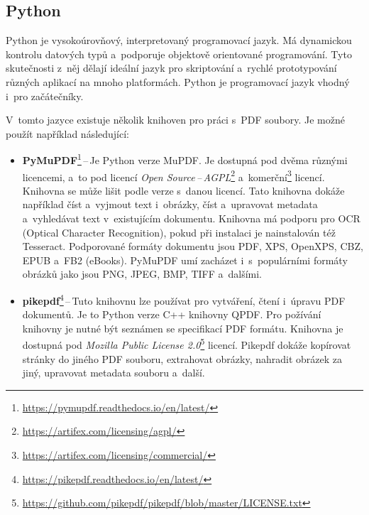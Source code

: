 \subsection*{Python} \label{python_libraries}

Python je vysokoúrovňový, interpretovaný programovací jazyk. Má dynamickou
kontrolu datových typů a~podporuje objektově orientované programování. Tyto
skutečnosti z~něj dělají ideální jazyk pro skriptování a~rychlé prototypování
různých aplikací na mnoho platformách. Python je programovací jazyk vhodný i~pro
začátečníky.
\cite{Python}

V~tomto jazyce existuje několik knihoven pro práci s~PDF soubory. Je možné použít
například následující: 
\begin{itemize}
    \item \textbf{PyMuPDF}\footnote{
    \href{https://pymupdf.readthedocs.io/en/latest/}{https://pymupdf.readthedocs.io/en/latest/}
    }\,--\,Je Python verze MuPDF. Je dostupná pod dvěma různými licencemi, a~to pod
    licencí \emph{Open Source\,--\,AGPL}\footnote{
    \href{https://artifex.com/licensing/agpl/}{https://artifex.com/licensing/agpl/}
    } a~komerční\footnote{
    \href{https://artifex.com/licensing/commercial/}{https://artifex.com/licensing/commercial/}
    } licencí. Knihovna se může lišit podle verze s~danou licencí. Tato knihovna
    dokáže například číst a~vyjmout text i~obrázky, číst a~upravovat
    metadata a~vyhledávat text v~existujícím dokumentu.
    Knihovna má podporu pro OCR (Optical Character Recognition), pokud při
    instalaci je nainstalován též Tesseract. Podporované formáty dokumentu jsou
    PDF, XPS, OpenXPS, CBZ, EPUB a~FB2 (eBooks). PyMuPDF umí zacházet
    i~s~populárními formáty obrázků jako jsou PNG, JPEG, BMP, TIFF a~dalšími.

    \item \textbf{pikepdf}\footnote{
    \href{https://pikepdf.readthedocs.io/en/latest/}{https://pikepdf.readthedocs.io/en/latest/}
    }\,--\,Tuto knihovnu lze používat pro vytváření, čtení i~úpravu PDF dokumentů.
    Je to Python verze C++ knihovny QPDF. Pro požívání knihovny je nutné být
    seznámen se specifikací PDF formátu. Knihovna je dostupná pod
    \emph{Mozilla Public License 2.0}\footnote{
    \href{https://github.com/pikepdf/pikepdf/blob/master/LICENSE.txt}{https://github.com/pikepdf/pikepdf/blob/master/LICENSE.txt}
    } licencí. Pikepdf dokáže kopírovat stránky do jiného PDF souboru, extrahovat
    obrázky, nahradit obrázek za jiný, upravovat metadata souboru a~další.

\end{itemize}


